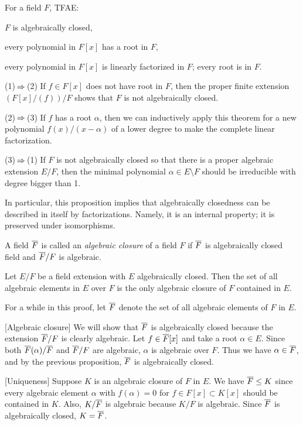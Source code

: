 \documentclass{../exp}
\begin{document}
\begin{prop}
For a field $F$, TFAE:
\begin{cond}
\item $F$ is algebraically closed,
\item every polynomial in $F[x]$ has a root in $F$,
\item every polynomial in $F[x]$ is linearly factorized in $F$; every root is in $F$.
\end{cond}
\end{prop}
\begin{pf}
(1)$\impl$(2)
If $f\in F[x]$ does not have root in $F$, then the proper finite extension $(F[x]/(f))/F$ shows that $F$ is not algebraically closed.

(2)$\impl$(3)
If $f$ has a root $\alpha$, then we can inductively apply this theorem for a new polynomial $f(x)/(x-\alpha)$ of a lower degree to make the complete linear factorization.

(3)$\impl$(1)
If $F$ is not algebraically closed so that there is a proper algebraic extension $E/F$, then the minimal polynomial $\alpha\in E\setminus F$ should be irreducible with degree bigger than 1.
\end{pf}
\begin{rmk}
In particular, this proposition implies that algebraically closedness can be described in itself by factorizations.
Namely, it is an internal property; it is preserved under isomorphisms.
\end{rmk}


\begin{defn}
A field $\overline F$ is called an \emph{algebraic closure} of a field $F$ if $\overline F$ is algebraically closed field and $\overline F/F$ is algebraic.
\end{defn}

\begin{prop}
Let $E/F$ be a field extension with $E$ algebraically closed.
Then the set of all algebraic elements in $E$ over $F$ is the only algebraic closure of $F$ contained in $E$.
\end{prop}
\begin{pf}
For a while in this proof, let $\overline F$ denote the set of all algebraic elements of $F$ in $E$.

[Algebraic closure]
We will show that $\overline F$ is algebraically closed because the extension $\overline F/F$ is clearly algebraic.
Let $f\in\overline F[x]$ and take a root $\alpha\in E$.
Since both $\overline F(\alpha)/\overline F$ and $\overline F/F$ are algebraic, $\alpha$ is algebraic over $F$.
Thus we have $\alpha\in\overline F$, and by the previous proposition, $\overline F$ is algebraically closed.

[Uniqueness]
Suppose $K$ is an algebraic closure of $F$ in $E$.
We have $\overline F\le K$ since every algebraic element $\alpha$ with $f(\alpha)=0$ for $f\in F[x]\subset K[x]$ should be contained in $K$.
Also, $K/\overline F$ is algebraic because $K/F$ is algebraic.
Since $\overline F$ is algebraically closed, $K=\overline F$.
\end{pf}
\end{document}
